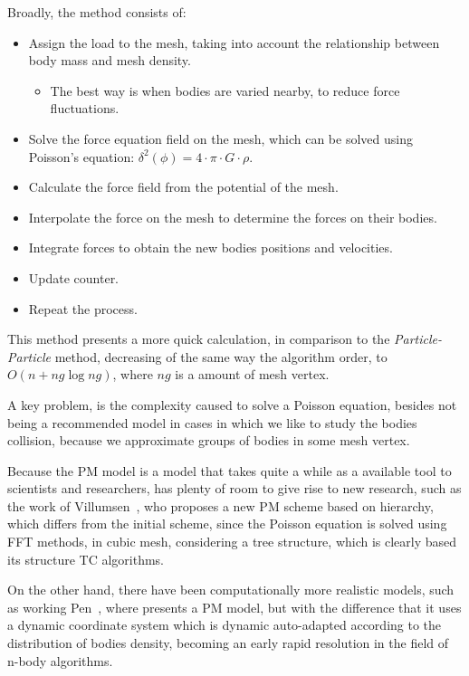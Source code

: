 Broadly, the method consists of:
\begin{itemize}
    \item Assign the load to the mesh, taking into account the relationship between
          body mass and mesh density.
    \begin{itemize}
        \item The best way is when bodies are varied
              nearby, to reduce force fluctuations.
    \end{itemize}
    \item Solve the force equation field on the mesh,
          which can be solved using Poisson's equation: $\delta^{2}(\phi) = 4\cdot\pi\cdot G\cdot \rho$.
    \item Calculate the force field from the potential of the mesh.
    \item Interpolate the force on the mesh to determine the forces
          on their bodies.
    \item Integrate forces to obtain the new bodies positions and velocities.
    \item Update counter.
    \item Repeat the process.
\end{itemize}

This method presents a more quick calculation, in comparison to the \emph{Particle-Particle} method,
decreasing of the same way the algorithm order, to $O(n + ng\log ng)$,
where $ng$ is a amount of mesh vertex.

A key problem, is the complexity caused to solve a Poisson equation,
besides not being a recommended model in cases in which we like to study
the bodies collision, because we approximate groups of bodies in
some mesh vertex.

Because the PM model is a model that takes quite a while as a available
tool to scientists and researchers, has plenty of room to give rise to new research,
such as the work of Villumsen~\cite{Villumsen}, who proposes
a new PM scheme based on hierarchy, which differs from the initial scheme,
since the Poisson equation is solved using FFT methods,
in cubic mesh, considering a tree structure,
which is clearly based its structure TC algorithms.

On the other hand, there have been computationally more realistic models,
such as working Pen~\cite{pen}, where presents a PM model, 
but with the difference that it uses a dynamic coordinate system
which is dynamic auto-adapted according to the distribution of bodies density,
becoming an early rapid resolution in the field of n-body algorithms.


